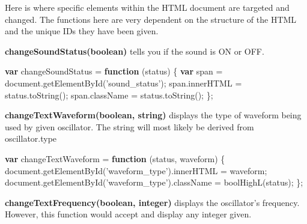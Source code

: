 \documentclass[]{article}
\newenvironment{Shaded}{}{}
\newcommand{\KeywordTok}[1]{\textcolor[rgb]{0.00,0.44,0.13}{\textbf{#1}}}
\newcommand{\StringTok}[1]{\textcolor[rgb]{0.25,0.44,0.63}{#1}}
\newcommand{\VariableTok}[1]{\textcolor[rgb]{0.10,0.09,0.49}{#1}}
\newcommand{\OperatorTok}[1]{\textcolor[rgb]{0.40,0.40,0.40}{#1}}
\newcommand{\AttributeTok}[1]{\textcolor[rgb]{0.49,0.56,0.16}{#1}}
\newcommand{\NormalTok}[1]{#1}
\begin{document}
Here is where specific elements within the HTML document are targeted
and changed. The functions here are very dependent on the structure of
the HTML and the unique IDs they have been given.

\textbf{changeSoundStatus(boolean)} tells you if the sound is ON or OFF.

\begin{Shaded}
\begin{Highlighting}[]
\KeywordTok{var}\NormalTok{ changeSoundStatus }\OperatorTok{=} \KeywordTok{function}\NormalTok{ (status) }\OperatorTok{\{}
    \KeywordTok{var}\NormalTok{ span }\OperatorTok{=} \VariableTok{document}\NormalTok{.}\AttributeTok{getElementById}\NormalTok{(}\StringTok{'sound_status'}\NormalTok{)}\OperatorTok{;}
    \VariableTok{span}\NormalTok{.}\AttributeTok{innerHTML} \OperatorTok{=} \VariableTok{status}\NormalTok{.}\AttributeTok{toString}\NormalTok{()}\OperatorTok{;}
    \VariableTok{span}\NormalTok{.}\AttributeTok{className} \OperatorTok{=} \VariableTok{status}\NormalTok{.}\AttributeTok{toString}\NormalTok{()}\OperatorTok{;}
\OperatorTok{\};}
\end{Highlighting}
\end{Shaded}

\textbf{changeTextWaveform(boolean, string)} displays the type of
waveform being used by given oscillator. The string will most likely be
derived from oscillator.type

\begin{Shaded}
\begin{Highlighting}[]
\KeywordTok{var}\NormalTok{ changeTextWaveform }\OperatorTok{=} \KeywordTok{function}\NormalTok{ (status}\OperatorTok{,}\NormalTok{ waveform) }\OperatorTok{\{}
    \VariableTok{document}\NormalTok{.}\AttributeTok{getElementById}\NormalTok{(}\StringTok{'waveform_type'}\NormalTok{).}\AttributeTok{innerHTML} \OperatorTok{=}\NormalTok{ waveform}\OperatorTok{;}
    \VariableTok{document}\NormalTok{.}\AttributeTok{getElementById}\NormalTok{(}\StringTok{'waveform_type'}\NormalTok{).}\AttributeTok{className} \OperatorTok{=} \AttributeTok{boolHighL}\NormalTok{(status)}\OperatorTok{;}
\OperatorTok{\};}
\end{Highlighting}
\end{Shaded}

\textbf{changeTextFrequency(boolean, integer)} displays the oscillator's
frequency. However, this function would accept and display any integer
given.
\end{document}
